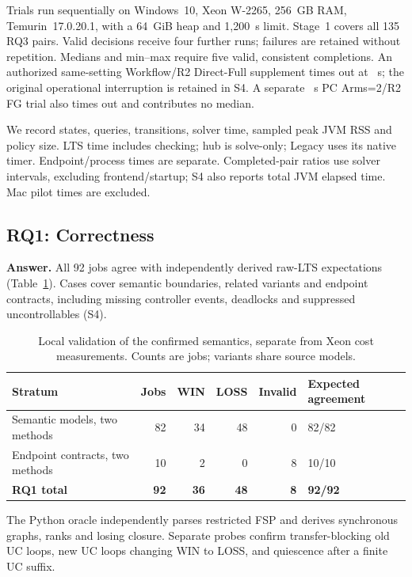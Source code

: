 \documentclass[acmsmall,screen,review,anonymous]{acmart}
\begin{document}
Trials run sequentially on Windows~10, Xeon W-2265, 256~GB RAM, Temurin~17.0.20.1, with a 64~GiB heap and 1,200~s limit. Stage~1 covers all 135 RQ3 pairs. Valid decisions receive four further runs; failures are retained without repetition. Medians and min--max require five valid, consistent completions. An authorized same-setting Workflow/R2 Direct-Full supplement times out at \ADWorkflowCapSeconds{}~s; the original operational interruption is retained in S4. A separate \ADPCCapSeconds{}~s PC Arms=2/R2 FG trial also times out and contributes no median.

We record states, queries, transitions, solver time, sampled peak JVM RSS and policy size. LTS time includes checking; hub is solve-only; Legacy uses its native timer. Endpoint/process times are separate. Completed-pair ratios use solver intervals, excluding frontend/startup; S4 also reports total JVM elapsed time. Mac pilot times are excluded.

\subsection{RQ1: Correctness}
\textbf{Answer.} All 92 jobs agree with independently derived raw-LTS expectations (Table~\ref{tab:rq1-validation}). Cases cover semantic boundaries, related variants and endpoint contracts, including missing controller events, deadlocks and suppressed uncontrollables (S4).

\begin{table}[!htbp]
\caption{Local validation of the confirmed semantics, separate from Xeon cost measurements. Counts are jobs; variants share source models.}
\label{tab:rq1-validation}
\centering\small
\begin{tabular}{@{}lrrrrl@{}}
\toprule
Stratum & Jobs & WIN & LOSS & Invalid & Expected agreement\\
\midrule
Semantic models, two methods & 82 & 34 & 48 & 0 & 82/82\\
Endpoint contracts, two methods & 10 & 2 & 0 & 8 & 10/10\\
\textbf{RQ1 total} & \textbf{92} & \textbf{36} & \textbf{48} & \textbf{8} & \textbf{92/92}\\
\bottomrule
\end{tabular}
\end{table}

The Python oracle independently parses restricted FSP and derives synchronous graphs, ranks and losing closure. Separate probes confirm transfer-blocking old UC loops, new UC loops changing WIN to LOSS, and quiescence after a finite UC suffix.
\end{document}
